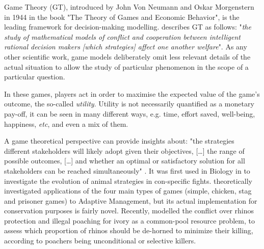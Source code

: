 \documentclass[12pt,a4paper]{article}
\begin{document}
Game Theory (GT), introduced by John Von Neumann and Oskar Morgenstern in 1944 in the book "The Theory of Games and Economic Behavior", is the leading framework for decision-making modelling.
\cite{myerson1997game} describes GT as follows: "\textit{the study of mathematical models of conflict and cooperation between intelligent rational decision makers [which strategies] affect one another welfare}".
As any other scientific work, game models deliberately omit less relevant details of the actual situation to allow the study of particular phenomenon in the scope of a particular question.

In these games, players act in order to maximise the expected value of the game's outcome, the so-called \textit{utility}.
Utility is not necessarily quantified as a monetary pay-off, it can be seen in many different ways, e.g. time, effort saved, well-being, happiness, \textit{etc}, and even a mix of them.

A game theoretical perspective can provide insights about: "the strategies different stakeholders will likely adopt given their objectives, [\dots] the range of possible outcomes, [\dots] and whether an optimal or satisfactory solution for all stakeholders can be reached simultaneously" \citep{COLYVAN20111246}.
It was first used in Biology in \cite{maynard1973logic} to investigate the evolution of animal strategies in con-specific fights.
\cite{COLYVAN20111246} theoretically investigated applications of the four main types of games (simple, chicken, stag and prisoner games) to Adaptive Management, but its actual implementation for conservation purposes is fairly novel.
Recently, \cite{glynatsi2018evolutionary} modelled the conflict over rhinos protection and illegal poaching for ivory as a common-pool resource problem, to assess which proportion of rhinos should be de-horned to minimize their killing, according to poachers being unconditional or selective killers. %
\end{document}

